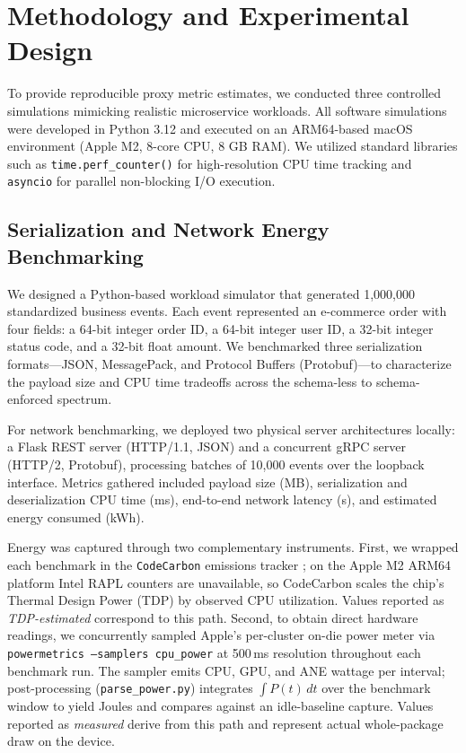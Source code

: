 \documentclass[conference]{IEEEtran}
\begin{document}
\section{Methodology and Experimental Design}
To provide reproducible proxy metric estimates, we conducted three controlled simulations mimicking realistic microservice workloads. All software simulations were developed in Python 3.12 and executed on an ARM64-based macOS environment (Apple M2, 8-core CPU, 8 GB RAM). We utilized standard libraries such as \texttt{time.perf\_counter()} for high-resolution CPU time tracking and \texttt{asyncio} for parallel non-blocking I/O execution.

\subsection{Serialization and Network Energy Benchmarking}
We designed a Python-based workload simulator that generated 1,000,000 standardized business events. Each event represented an e-commerce order with four fields: a 64-bit integer order ID, a 64-bit integer user ID, a 32-bit integer status code, and a 32-bit float amount. We benchmarked three serialization formats---JSON, MessagePack, and Protocol Buffers (Protobuf)---to characterize the payload size and CPU time tradeoffs across the schema-less to schema-enforced spectrum.

For network benchmarking, we deployed two physical server architectures locally: a Flask REST server (HTTP/1.1, JSON) and a concurrent gRPC server (HTTP/2, Protobuf), processing batches of 10,000 events over the loopback interface. Metrics gathered included payload size (MB), serialization and deserialization CPU time (ms), end-to-end network latency (s), and estimated energy consumed (kWh).

Energy was captured through two complementary instruments. First, we wrapped each benchmark in the \texttt{CodeCarbon} emissions tracker \cite{b7}; on the Apple M2 ARM64 platform Intel RAPL counters are unavailable, so CodeCarbon scales the chip's Thermal Design Power (TDP) by observed CPU utilization. Values reported as \emph{TDP-estimated} correspond to this path. Second, to obtain direct hardware readings, we concurrently sampled Apple's per-cluster on-die power meter via \texttt{powermetrics --samplers cpu\_power} at 500\,ms resolution throughout each benchmark run. The sampler emits CPU, GPU, and ANE wattage per interval; post-processing (\texttt{parse\_power.py}) integrates $\int P(t)\,dt$ over the benchmark window to yield Joules and compares against an idle-baseline capture. Values reported as \emph{measured} derive from this path and represent actual whole-package draw on the device.
\end{document}
